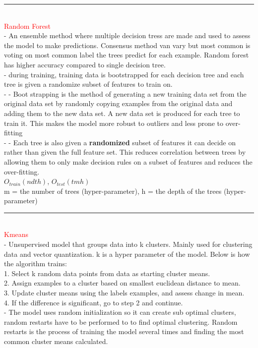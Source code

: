 \documentclass[8pt]{extarticle}
\begin{document}
\begin{multicols*}{2}
\rule{\linewidth}{0.5mm} 
\\
\textcolor{red}{Random Forest}
\\
- An ensemble method where multiple decision tress are made and used to assess the model to make predictions. Consensus method van vary but most common is voting on most common label the trees predict for each example. Random forest has higher accuracy compared to single decision tree.
\\
- during training, training data is bootstrapped for each decision tree and each tree is given  a randomize subset of features to train on. 
\\
- - Boot strapping is the method of generating a new training data set from the original data set by randomly copying examples from the original data and adding them to the new data set. A new data set is produced for each tree to train it. This makes the model more robust to outliers and less prone to over-fitting
\\
- - Each tree is also given a \textbf{randomized} subset of features it can decide on rather than given the full feature set. This reduces correlation between trees by allowing them to only make decision rules on a subset of features and reduces the over-fitting.
\\
$O_{train}(ndth)$, $O_{test}(tmh)$
\\
m = the number of trees (hyper-parameter), h = the depth of the trees (hyper-parameter)
\\
\rule{\linewidth}{0.5mm} 
\\
\textcolor{red}{Kmeans}
\\
- Unsupervised model that groups data into k clusters. Mainly used for clustering data and vector quantization. k is a hyper parameter of the model.  Below is how the algorithm trains:
\\
1. Select k random data points from data as starting cluster means.
\\ 
2. Assign examples to a cluster based on smallest euclidean distance to mean.
\\
3. Update cluster means using the labels examples, and assess change in mean.
\\
4. If the difference is significant, go to step 2 and continue.
\\
- The model uses random initialization so it can create sub optimal clusters, random restarts have to be performed to to find optimal clustering. Random restarts is the process of training the model several times and finding the most common cluster means calculated. 

\end{multicols*}
\end{document}
